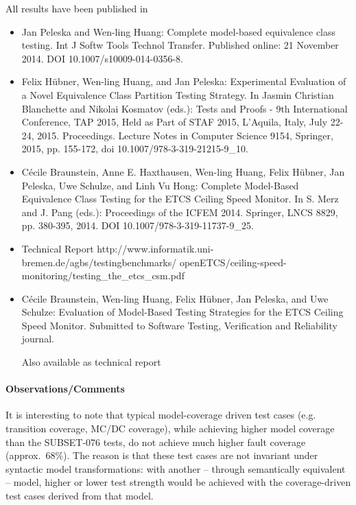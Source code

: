 All   results have been published in 
\begin{itemize}
\item Jan Peleska and Wen-ling Huang: Complete model-based equivalence
  class testing. Int J Softw Tools Technol Transfer. Published online:
  21 November 2014. DOI 10.1007/s10009-014-0356-8.

\item Felix H\"ubner, Wen-ling Huang, and Jan Peleska: Experimental
  Evaluation of a Novel Equivalence Class Partition Testing
  Strategy. In Jasmin Christian Blanchette and Nikolai Kosmatov
  (eds.): Tests and Proofs - 9th International Conference, TAP 2015,
  Held as Part of STAF 2015, L'Aquila, Italy, July 22-24,
  2015. Proceedings. Lecture Notes in Computer Science 9154, Springer,
  2015, pp. 155-172, doi 10.1007/978-3-319-21215-9\_10.

\item C{\'e}cile Braunstein, Anne E. Haxthausen, Wen-ling Huang, Felix
  H\"ubner, Jan Peleska, Uwe Schulze, and Linh Vu Hong: Complete
  Model-Based Equivalence Class Testing for the ETCS Ceiling Speed
  Monitor. In S. Merz and J. Pang (eds.): Proceedings of the ICFEM
  2014. Springer, LNCS 8829, pp. 380-395, 2014. DOI
  10.1007/978-3-319-11737-9\_25.


\item Technical Report http://www.informatik.uni-bremen.de/agbs/testingbenchmarks/
\newline
openETCS/ceiling-speed-monitoring/testing\_the\_etcs\_csm.pdf


\item C{\'e}cile Braunstein, Wen-ling Huang, Felix H\"ubner, Jan
  Peleska, and Uwe Schulze: Evaluation of Model-Based Testing
  Strategies for the ETCS Ceiling Speed Monitor.  Submitted to
  Software Testing, Verification and Reliability journal.

Also available as technical report
\end{itemize}

\paragraph{Observations/Comments}

It is interesting to note that typical model-coverage driven test
cases (e.g. transition coverage, MC/DC coverage), while achieving
higher model coverage than the SUBSET-076 tests, do not achieve much
higher fault coverage (approx.~68\%).  The reason is that these test
cases are not invariant under syntactic model transformations: with
another -- through semantically equivalent -- model, higher or lower
test strength would be achieved with the coverage-driven test cases
derived from that model.

